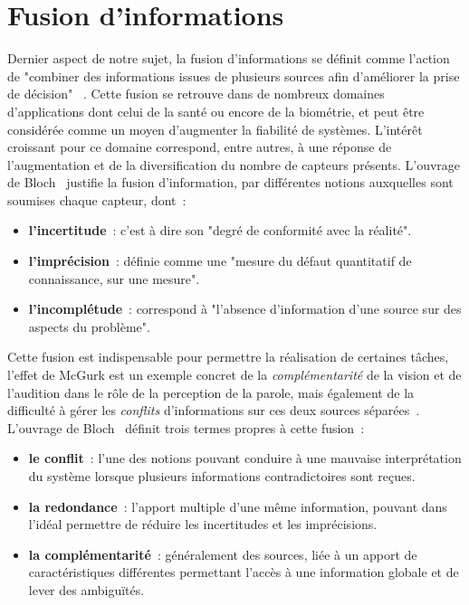 \clearpage

\section{Fusion d’informations}
\label{sec:fusion_information}
Dernier aspect de notre sujet, la fusion d’informations se définit comme l’action de "combiner des informations issues de plusieurs sources afin d’améliorer la prise de décision" ~\cite{Bloch2003}. Cette fusion se retrouve dans de nombreux domaines d'applications dont celui de la santé ou encore de la biométrie, et peut être considérée comme un moyen d'augmenter la fiabilité de systèmes. L'intérêt croissant pour ce domaine correspond, entre autres, à une réponse de l'augmentation et de la diversification du nombre de capteurs présents. L'ouvrage de Bloch~\cite{Bloch2003} justifie la fusion d'information, par différentes notions auxquelles sont soumises chaque capteur, dont~:
\begin{itemize}
    \item \textbf{l'incertitude}~: c'est à dire son "degré de conformité avec la réalité".
    \item \textbf{l'imprécision}~: définie comme une "mesure du défaut quantitatif de connaissance, sur une mesure".
    \item \textbf{l'incomplétude}~: correspond à "l'absence d'information d'une source sur des aspects du problème".
\end{itemize}\par

Cette fusion est indispensable pour permettre la réalisation de certaines tâches, l'effet de McGurk est un exemple concret de la \textit{complémentarité} de la vision et de l'audition dans le rôle de la perception de la parole, mais également de la difficulté à gérer les \textit{conflits} d'informations sur ces deux sources séparées~\cite{Mcgurk1976}. L'ouvrage de Bloch~\cite{Bloch2003} définit trois termes propres à cette fusion~:
\begin{itemize}
    \item \textbf{le conflit}~: l'une des notions pouvant conduire à une mauvaise interprétation du système lorsque plusieurs informations contradictoires sont reçues.
    \item \textbf{la redondance}~: l'apport multiple d'une même information, pouvant dans l'idéal permettre de réduire les incertitudes et les imprécisions.
    \item \textbf{la complémentarité}~: généralement des sources, liée à un apport de caractéristiques différentes permettant l'accès à une information globale et de lever des ambiguïtés.
\end{itemize}\par


